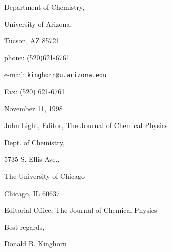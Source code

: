 \documentclass[12pt]{article}
\begin{document}
\begin{letterfrom}
\end{letterfrom}

\begin{letterfromcompany}
\end{letterfromcompany}

\begin{letterfromaddr}
Department of Chemistry,

University of Arizona,

Tucson, AZ 85721\newline

phone: (520)621-6761

e-mail: \texttt{kinghorn@u.arizona.edu}

Fax: (520) 621-6761
\end{letterfromaddr}

\begin{letterdate}
November 11, 1998
\end{letterdate}

\begin{letterto}
\end{letterto}

\begin{lettertoaddr}
John Light, Editor, The Journal of Chemical Physics

Dept. of Chemistry,

5735 S. Ellis Ave.,

The University of Chicago

Chicago, IL 60637
\end{lettertoaddr}

\begin{letterattention}
Editorial Office, The Journal of Chemical Physics
\end{letterattention}

\begin{lettersubj}
\end{lettersubj}

\begin{letterclosing}
Best regards,
\end{letterclosing}

\begin{lettersign}
Donald B. Kinghorn
\end{lettersign}

\begin{letterps}
\end{letterps}

\begin{letterinitials}
\end{letterinitials}
\end{document}
